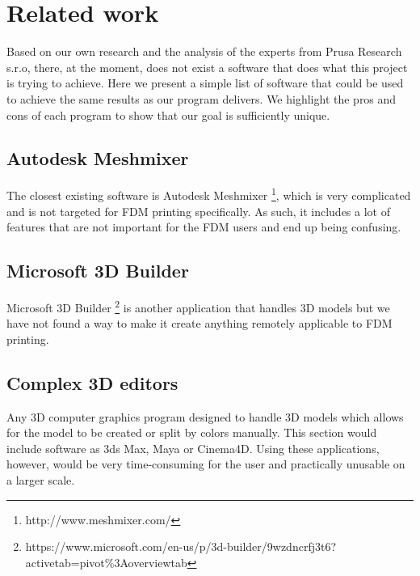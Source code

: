 
\chapter{Related work}

Based on our own research and the analysis of the experts from Prusa Research s.r.o, there, at the moment, does not exist a software that does what this project is trying to achieve. Here we present a simple list of software that could be used to achieve the same results as our program delivers. We highlight the pros and cons of each program to show that our goal is sufficiently unique.

\section{Autodesk Meshmixer}

The closest existing software is Autodesk Meshmixer \footnote{http://www.meshmixer.com/}, which is very complicated and is not targeted for FDM printing specifically. As such, it includes a lot of features that are not important for the FDM users and end up being confusing.

\section{Microsoft 3D Builder}

Microsoft 3D Builder \footnote{https://www.microsoft.com/en-us/p/3d-builder/9wzdncrfj3t6?activetab=pivot\%3Aoverviewtab} is another application that handles 3D models but we have not found a way to make it create anything remotely applicable to FDM printing.

\section{Complex 3D editors}

Any 3D computer graphics program designed to handle 3D models which allows for the model to be created or split by colors manually. This section would include software as 3ds Max, Maya or Cinema4D. Using these applications, however, would be very time-consuming for the user and practically unusable on a larger scale.

